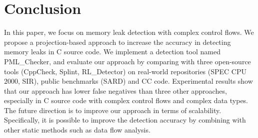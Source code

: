 \section{Conclusion}\label{sec:conclusion}

In this paper, we focus on memory leak detection with complex control flows. We propose a projection-based approach to increase the accuracy in detecting memory leaks in C source code. We implement a detection tool named PML\_Checker, and evaluate our approach by comparing with three open-source tools (CppCheck, Splint, RL\_Detector) on real-world repositories (SPEC CPU $2000$, SIR), public benchmarks (SARD) and CC code. Experimental results show that our approach has lower false negatives than three other approaches, especially in C source code with complex control flows and complex data types. The future direction is to improve our approach in terms of scalability. Specifically, it is possible to improve the detection accuracy by combining with other static methods such as data flow analysis.
